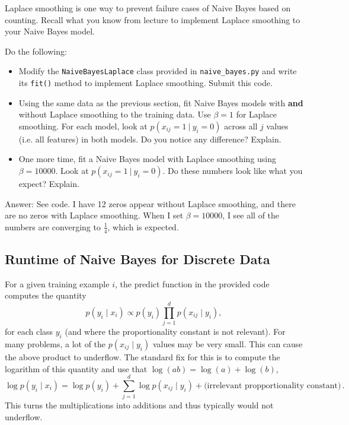 \documentclass{article}
\def\ans#1{\par\gre{Answer: #1}}
\def\blu#1{{\color{blu}#1}}
\def\gre#1{{\color{gre}#1}}
\def\cond{\; | \;}
\begin{document}
	Laplace smoothing is one way to prevent failure cases of Naive Bayes based on counting. Recall what you know from lecture to implement Laplace smoothing to your Naive Bayes model. \blu{Do the following:
		\begin{itemize}
			\item Modify the \texttt{NaiveBayesLaplace} class provided in \texttt{naive\_bayes.py} and write its \texttt{fit()} method to implement Laplace smoothing. Submit this code.
			\item Using the same data as the previous section, fit Naive Bayes models with \textbf{and} without Laplace smoothing to the training data. Use $\beta=1$ for Laplace smoothing. For each model, look at $p(x_{ij} = 1 \ | \ y_i = 0)$ across all $j$ values (i.e. all features) in both models. Do you notice any difference? Explain.
			\item One more time, fit a Naive Bayes model with Laplace smoothing using $\beta=10000$. Look at $p(x_{ij} = 1 \ | \ y_i = 0)$. Do these numbers look like what you expect? Explain.
		\end{itemize}
	}
	\ans{
		See code. I have 12 zeros appear without Laplace smoothing, and there are no zeros with Laplace smoothing. When I set $\beta=10000$, I see all of the numbers are converging to $\frac{1}{4}$, which is expected.
	}
	
	\subsection{Runtime of Naive Bayes for Discrete Data}
	
	For a given training example $i$, the predict function in the provided code computes the quantity
	\[
	p(y_i \cond x_i) \propto p(y_i)\prod_{j=1}^d p(x_{ij} \cond y_i),
	\]
	for each class $y_i$ (and where the proportionality constant is not relevant). For many problems, a lot of the $p(x_{ij} \cond y_i)$ values may be very small. This can cause the above product to underflow. The standard fix for this is to compute the logarithm of this quantity and use that $\log(ab) = \log(a)+\log(b)$,
	\[
	\log p(y_i \cond x_i) = \log p(y_i) + \sum_{j=1}^d \log p(x_{ij} \cond y_i) + \text{(irrelevant propportionality constant)} \, .
	\]
	This turns the multiplications into additions and thus typically would not underflow.
	
\end{document}
